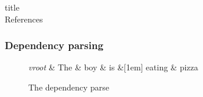 \documentclass[xcolor={dvipsnames}]{beamer}
\begin{document}
\begin{beamercolorbox}{title}
\mbox{}\\[1ex]%
References
\end{beamercolorbox}
\medskip
\scriptsize




\begin{frame}
\frametitle{Dependency parsing}
\begin{figure}[htb!]
\begin{center}
    \begin{dependency}[arc edge,text only label,label style={above}]
    \begin{deptext}[column sep=.5em]
      \textit{vroot} \& The \& boy \& is \&[1em] eating \& pizza \\
    \end{deptext}
  \end{dependency}
\end{center}
\caption{The dependency parse}
\label{fig:prep-dependency}
\end{figure}

\end{frame}
\end{document}

